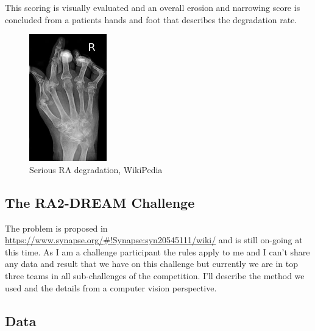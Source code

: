 \documentclass[a4paper,12pt]{article}
\begin{document}
\vspace{4mm}

\par This scoring is visually evaluated and an overall erosion and narrowing score is concluded from a patients hands and foot that describes the degradation rate. 

\vspace{4mm}

\begin{figure}[H]
    \centering
    \includegraphics[width=0.3\textwidth]{ra/RheumatoideArthritisAP.jpg}
    \caption{Serious RA degradation, WikiPedia}
    \label{fig:ra_wiki}
\end{figure}

\vspace{4mm}

\subsection{The RA2-DREAM Challenge}

\vspace{4mm}

\par The problem is proposed in \url{https://www.synapse.org/#!Synapse:syn20545111/wiki/} and is still on-going at this time. As I am a challenge participant the rules apply to me and I can't share any data and result that we have on this challenge but currently we are in top three teams in all sub-challenges of the competition. I'll describe the method we used and the details from a computer vision perspective.

\vspace{4mm}

\subsection{Data}
\end{document}

